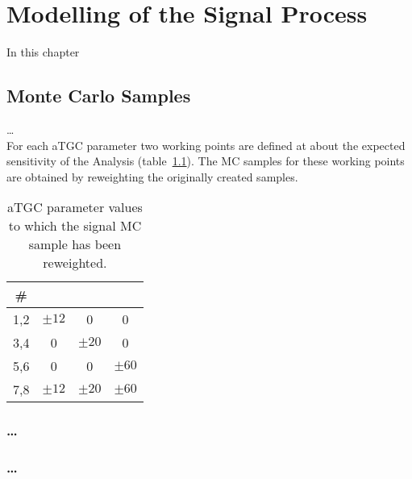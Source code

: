 \chapter{Modelling of the Signal Process}
\label{chap:signal}
In this chapter 
\section{Monte Carlo Samples}
\dots \\
For each aTGC parameter two working points are defined at about the expected sensitivity of the Analysis (table~\ref{tab:signal:aTGCpoints}). The MC samples for these working points are obtained by reweighting the originally created samples.
\begin{table}
	\centering
	\caption[aTGC working points]{aTGC parameter values to which the signal MC sample has been reweighted.}
	\label{tab:signal:aTGCpoints}
	\begin{tabular}{cccc}
	\hline
	\# & \Tcwww & \Tccw & \Tcb \\
	\hline
	1,2 &  $\pm 12$ & 0 & 0\\
	3,4 & 0 &  $\pm 20$ & 0\\
	5,6 & 0 & 0 &  $\pm 60$\\
	7,8 &	$\pm 12$ & $\pm 20$ & $\pm 60$\\
	\hline
	\end{tabular}
\end{table} 
\subsection{\dots}
\subsection{\dots}
